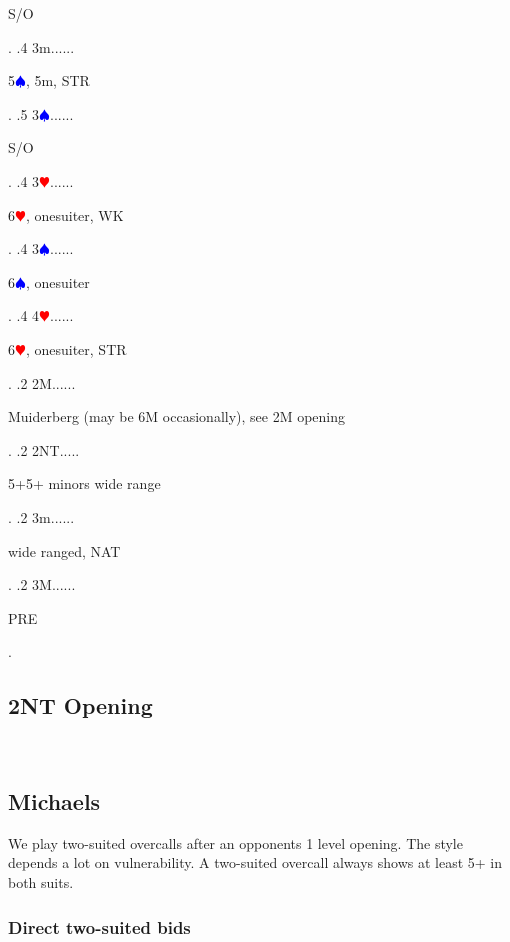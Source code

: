 \documentclass[a4paper]{article}
\newcommand{\BH}{\textcolor{Red}{$\varheartsuit${}}}
\newcommand{\BS}{\textcolor{Blue}{$\spadesuit${}}}
\begin{document}
{\begin{minipage}[t]{0.8\textwidth}
S/O
\end{minipage}. 
 .4 3m......\begin{minipage}[t]{0.8\textwidth}
5\BS , 5m, STR
\end{minipage}. 
 .5 3\BS......\begin{minipage}[t]{0.8\textwidth}
S/O
\end{minipage}. 
 .4 3\BH......\begin{minipage}[t]{0.8\textwidth}
6\BH , onesuiter, WK
\end{minipage}. 
 .4 3\BS......\begin{minipage}[t]{0.8\textwidth}
6\BS , onesuiter
\end{minipage}. 
 .4 4\BH......\begin{minipage}[t]{0.8\textwidth}
6\BH , onesuiter, STR
\end{minipage}. 
 .2 2M......\begin{minipage}[t]{0.8\textwidth}
Muiderberg (may be 6M occasionally), see 2M opening
\end{minipage}. 
 .2 2NT.....\begin{minipage}[t]{0.8\textwidth}
5+5+ minors wide range
\end{minipage}. 
 .2 3m......\begin{minipage}[t]{0.8\textwidth}
wide ranged, NAT
\end{minipage}. 
 .2 3M......\begin{minipage}[t]{0.8\textwidth}
PRE
\end{minipage}. 
}
\bigbreak
\subsection{2NT Opening}

\
\bigbreak
\subsection{Michaels}

We play two-suited overcalls after an opponents 1 level opening. The style
depends a lot on vulnerability. A two-suited overcall always shows at least 5+
in both suits.
\bigbreak
\subsubsection{Direct two-suited bids}
\end{document}
